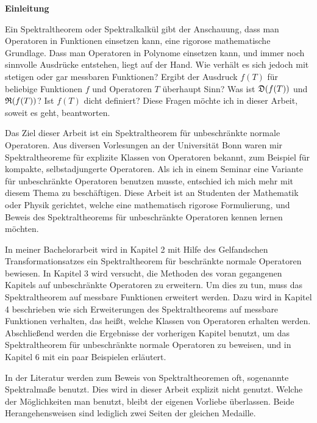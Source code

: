 {\Large \textbf{Einleitung}}
\vspace{.35cm}

Ein Spektraltheorem oder Spektralkalkül gibt der Anschauung, dass man 
Operatoren in Funktionen einsetzen kann, eine 
rigorose mathematische Grundlage.
Dass man Operatoren in Polynome einsetzen kann, und immer noch sinnvolle
Ausdrücke entstehen, liegt auf der Hand. Wie verhält es sich jedoch mit
stetigen oder gar messbaren Funktionen? Ergibt der Ausdruck $f(T)$ für
beliebige Funktionen $f$ und Operatoren $T$ überhaupt Sinn? Was ist 
$\mathfrak{D}(f(T))$ und $\mathfrak{R}(f(T))$? Ist $f(T)$ dicht definiert?
Diese Fragen möchte ich in dieser Arbeit, soweit es geht, beantworten.

Das Ziel dieser Arbeit ist ein Spektraltheorem für unbeschränkte normale 
Operatoren. Aus diversen Vorlesungen an der Universität Bonn waren mir
Spektraltheoreme für explizite Klassen von Operatoren bekannt, zum 
Beispiel für kompakte, selbstadjungerte Operatoren. Als ich in einem Seminar
eine Variante für unbeschränkte Operatoren benutzen musste, entschied ich
mich mehr mit diesem Thema zu beschäftigen. Diese Arbeit
ist an Studenten der Mathematik oder Physik gerichtet, welche eine 
mathematisch rigorose Formulierung, und Beweis des Spektraltheorems
für unbeschränkte Operatoren kennen lernen möchten.

In meiner Bachelorarbeit wird in Kapitel 2 mit Hilfe des Gelfandschen 
Transformationsatzes ein Spektraltheorem für beschränkte normale Operatoren 
bewiesen. In Kapitel 3 wird versucht, die Methoden des voran gegangenen Kapitels
auf unbeschränkte Operatoren zu erweitern. Um dies zu tun, muss das 
Spektraltheorem auf messbare Funktionen erweitert werden.
Dazu wird in Kapitel 4 beschrieben wie sich Erweiterungen des 
Spektraltheorems auf messbare Funktionen verhalten, das heißt, welche Klassen
von Operatoren erhalten werden. Abschließend werden die Ergebnisse der 
vorherigen Kapitel benutzt, um das Spektraltheorem für unbeschränkte normale
Operatoren zu beweisen, und in Kapitel 6 mit ein paar Beispielen erläutert.

In der Literatur werden zum Beweis von Spektraltheoremen oft, sogenannte 
Spektralmaße benutzt.
Dies wird in dieser Arbeit explizit nicht genutzt. Welche der Möglichkeiten
man benutzt, bleibt der eigenen Vorliebe überlassen. Beide Herangehensweisen
sind lediglich zwei Seiten der 
gleichen Medaille.
